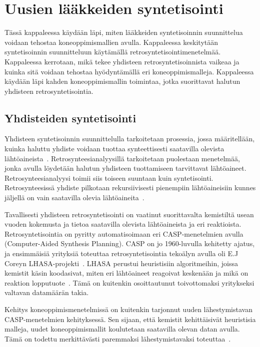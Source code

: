 \documentclass[finnish,twoside,censored,tkt,sw-line]{HYthesisML}
\begin{document}
\chapter{Uusien lääkkeiden syntetisointi}

Tässä kappaleessa käydään läpi, miten lääkkeiden syntetisoinnin suunnittelua voidaan tehostaa koneoppimismallien avulla.
Kappaleessa keskitytään syntetisoinnin suunnitteluun käytämällä retrosyntetisointimenetelmää.
Kappaleessa kerrotaan, mikä tekee yhdisteen retrosyntetisoinnista vaikeaa ja kuinka sitä voidaan tehostaa hyödyntämällä eri koneoppimismalleja.
Kappaleessa käydään läpi kahden koneoppimismallin toimintaa, jotka suorittavat halutun yhdisteen retrosyntetisointia.

\section{Yhdisteiden syntetisointi}

Yhdisteen syntetisoinnin suunnittelulla tarkoitetaan prosessia, jossa määritellään, kuinka haluttu yhdiste voidaan tuottaa synteettisesti saatavilla olevista lähtöaineista~\cite{ColeyConnorW2018MLiC}.
Retrosynteesianalyysillä tarkoitetaan puolestaan menetelmää, jonka avulla löydetään halutun yhdisteen tuottamiseen tarvittavat lähtöaineet.
Retrosynteesianalyysi toimii siis toiseen suuntaan kuin syntetisointi.
Retrosynteesissä yhdiste pilkotaan rekursiivisesti pienempiin lähtöaineisiin kunnes jäljellä on vain saatavilla olevia lähtöaineita~\cite{ECoreyRetrosynthesis}.

Tavallisesti yhdisteen retrosyntetisointi on vaatinut suorittavalta kemistiltä usean vuoden kokemusta ja tietoa saatavilla olevista lähtöaineista ja eri reaktioista.
Retrosyntetisointia on pyritty automatisoimaan eri CASP-menetelmien avulla (Computer-Aided Synthesis Planning).
CASP on jo 1960-luvulla kehitetty ajatus, ja ensimmäisiä yrityksiä toteuttaa retrosyntetisointia tekoälyn avulla oli E.J Coreyn LHASA-projekti~\cite{ColeyConnorW2018MLiC}.
LHASA perustui heuristisiin algoritmeihin, joissa kemistit käsin koodasivat, miten eri lähtöaineet reagoivat keskenään ja mikä on reaktion lopputuote~\cite{LHASA}.
Tämä on kuitenkin osoittautunut toivottomaksi yritykseksi valtavan datamäärän takia.

Kehitys koneoppimismenetelmissä on kuitenkin tarjonnut uuden lähestymistavan CASP-menetelmien kehityksessä.
Sen sijaan, että kemistit kehittäisivät heuristisia malleja, uudet koneoppimismallit koulutetaan saatavilla olevan datan avulla.
Tämä on todettu merkittävästi paremmaksi lähestymistavaksi toteuttaa~\cite{ColeyConnorW2018MLiC}.
\end{document}
